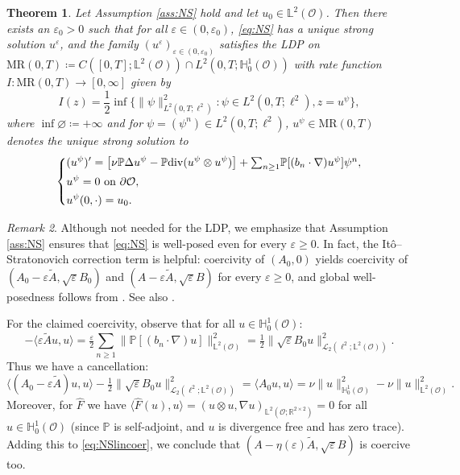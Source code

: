 \documentclass{amsart}
\renewcommand{\MR}{\mathrm{MR}}
\newcommand{\<}{\langle}
\newcommand{\?}{\rangle}
\newcommand{\ceqq}{\coloneqq}
\newcommand{\col}{\colon}
\renewcommand{\O}{\mathcal{O}}
\newcommand{\Ls}{\mathbb{L}}
\newcommand{\Hs}{\mathbb{H}}
\renewcommand{\div}{\mathrm{div}}
\theoremstyle{plain}
\newtheorem{theorem}{Theorem}[section]
\theoremstyle{remark}
\newtheorem{remark}[theorem]{Remark}
\theoremstyle{plain}
\numberwithin{equation}{section}
\def\R{{\mathbb R}}
\renewcommand{\P}{\mathbb{P}}
\newcommand{\eps}{\varepsilon}
\begin{document}
\begin{theorem}\label{th:NS} 
Let Assumption \ref{ass:NS} hold and let $u_0\in \Ls^2(\O)$. Then there exists an $\eps_0>0$ such that  
for all $\eps\in(0,\eps_0)$, 
\eqref{eq:NS} has a unique strong solution $u^\eps$, and 
the family $(u^\eps)_{\eps\in(0,\eps_0)}$ satisfies the LDP on $\MR(0,T)\ceqq C([0,T];\Ls^2(\O))\cap L^2(0,T;\Hs^1_0(\O))$ with rate function $I\col \MR(0,T)\to[0,\infty]$ given by 
\[
I(z)=\frac12\inf\{\|\psi\|_{L^2(0,T;\ell^2)}^2:\psi \in L^2(0,T;\ell^2), z=u^{\psi} \},
\]
where $\inf\varnothing\ceqq+\infty$ and for $\psi=(\psi^n)\in L^2(0,T;\ell^2)$,  $u^\psi\in  \MR(0,T)$ denotes the unique strong solution to 
\begin{equation*} 
\left\{
\begin{aligned}
&(u^{\psi})' =\big[\nu\P \Delta u^{\psi} - \P\div(u^{\psi}\otimes u^{\psi})\big]  
+ \textstyle{\sum_{n\geq 1}} \P[(b_{n}\cdot\nabla) u^{\psi}]\psi^n,\\ 
&u^{\psi}=0 \textup{ on } \partial \O,\\ 
&u^{\psi}(0,\cdot)=u_0.
\end{aligned}\right.
\end{equation*} 
\end{theorem} 

\begin{remark}\label{rem:NS coer}
Although not needed for the LDP, we emphasize that 
  Assumption \ref{ass:NS} ensures that  \eqref{eq:NS} is  well-posed even for every $\eps\geq 0$. In fact, the It\^o--Stratonovich correction term is  helpful: coercivity of $(A_0,0)$ yields coercivity of   $(A_0-\eps \tilde{A},\sqrt{\eps}B_0)$ and $(A-\eps \tilde{A},\sqrt{\eps}B)$ for every $\eps\geq 0$, and global well-posedness follows from \cite[Th.\ 7.10]{AV25survey}. See also  \cite[(A.1), Asm.\ A.1, Prop.\ A.5]{AV24SNS}.  
 
For the claimed coercivity, observe that for all  $u\in \Hs_0^1(\O)$:
\[
-\<\eps\tilde{A}u,u\?=\tfrac{\eps}{2}\textstyle{\sum_{n\geq 1}}\|\P[(b_n\cdot\nabla) u ]\|_{\Ls^2(\O)}^2 =\tfrac12\|\sqrt{\eps}B_0u\|_{\mathscr{L}_2(\ell^2;\Ls^2(\O))}^2.  
\]
Thus we have a cancellation: 
\begin{equation}\label{eq:NSlincoer}
\<(A_0-\eps\tilde{A})u,u\?-\tfrac12\|\sqrt{\eps}B_0u\|_{\mathscr{L}_2(\ell^2;\Ls^2(\O))}^2=\<A_0u,u\?= 
{\nu}\|u\|_{\Hs^1_0(\O)}^2-\nu\|u\|_{\Ls^2(\O)}^2. 
\end{equation}    
Moreover, for $\hat{F}$ we have   
$
\<\hat{F}(u),u\?=(u\otimes u,\nabla u)_{\Ls^2(\O;\R^{2\times 2})}=0  
$ for all   $u\in \Hs_0^1(\O)$  (since $\P$ is self-adjoint, and $u$ is divergence free and has zero trace). 
Adding this to \eqref{eq:NSlincoer}, we conclude that $(A-\eta(\eps)\tilde{A},\sqrt{\eps}B)$ is coercive too.  
\end{remark}
\end{document}
